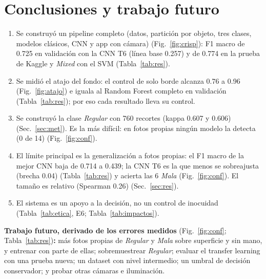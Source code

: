 \documentclass[conference]{IEEEtran}
\begin{document}
\section{Conclusiones y trabajo futuro}
\begin{enumerate}
\item Se construy\'o un pipeline completo (datos, partici\'on por objeto, tres clases, modelos cl\'asicos, CNN y app con c\'amara) (Fig.~\ref{fig:crisp}): F1 macro de 0.725 en validaci\'on con la CNN T6 (l\'inea base 0.257) y de 0.774 en la prueba de Kaggle y \emph{Mixed} con el SVM (Tabla~\ref{tab:res}).
\item Se midi\'o el atajo del fondo: el control de solo borde alcanza 0.76 a 0.96 (Fig.~\ref{fig:atajo}) e iguala al Random Forest completo en validaci\'on (Tabla~\ref{tab:res}); por eso cada resultado lleva su control.
\item Se construy\'o la clase \emph{Regular} con 760 recortes (kappa 0.607 y 0.606) (Sec.~\ref{sec:met}). Es la m\'as dif\'icil: en fotos propias ning\'un modelo la detecta (0 de 14) (Fig.~\ref{fig:conf}).
\item El l\'imite principal es la generalizaci\'on a fotos propias: el F1 macro de la mejor CNN baja de 0.714 a 0.439; la CNN T6 es la que menos se sobreajusta (brecha 0.04) (Tabla~\ref{tab:res}) y acierta las 6 \emph{Mala} (Fig.~\ref{fig:conf}). El tama\~no es relativo (Spearman 0.26) (Sec.~\ref{sec:res}).
\item El sistema es un apoyo a la decisi\'on, no un control de inocuidad (Tabla~\ref{tab:etica}, E6; Tabla~\ref{tab:impactos}).
\end{enumerate}
\textbf{Trabajo futuro, derivado de los errores medidos} (Fig.~\ref{fig:conf}; Tabla~\ref{tab:res})\textbf{:} m\'as fotos propias de \emph{Regular} y \emph{Mala} sobre superficie y sin mano, y entrenar con parte de ellas; sobremuestrear \emph{Regular}; evaluar el transfer learning con una prueba nueva; un dataset con nivel intermedio; un umbral de decisi\'on conservador; y probar otras c\'amaras e iluminaci\'on.



\end{document}
